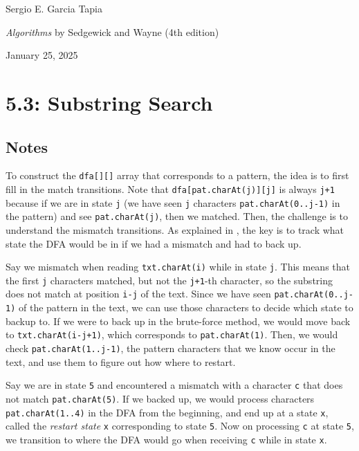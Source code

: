 \documentclass[12pt, a4paper]{article}
\begin{document}
	\noindent Sergio E. Garcia Tapia \hfill
	
	\noindent \emph{Algorithms} by Sedgewick and Wayne (4th edition) \cite{sedgewick_wayne}\hfill
	
	\noindent January 25, 2025\hfill 
	\section*{5.3: Substring Search}
	\subsection*{Notes}
	To construct the \texttt{dfa[][]} array that corresponds to a pattern, the idea is to first
	fill in the match transitions. Note that \texttt{dfa[pat.charAt(j)][j]} is always \texttt{j+1}
	because if we are in state \texttt{j} (we have seen \texttt{j} characters \texttt{pat.charAt(0..j-1)}
	in the pattern) and see \texttt{pat.charAt(j)}, then we matched. Then, the challenge is
	to understand the mismatch transitions. As explained in \cite{sedgewick_wayne}, the key is
	to track what state the DFA would be in if we had a mismatch and had to back up.
	
	Say we mismatch when reading \texttt{txt.charAt(i)} while in state \texttt{j}. This
	means that the first \texttt{j} characters matched, but not the \texttt{j+1}-th character,
	so the substring does not match at position \texttt{i-j} of the text. Since we have
	seen \texttt{pat.charAt(0..j-1)} of the pattern in the text, we can use those characters
	to decide which state to backup to. If we were to back up in the brute-force method, we
	would move back to \texttt{txt.charAt(i-j+1)}, which corresponds to \texttt{pat.charAt(1)}.
	Then, we would check \texttt{pat.charAt(1..j-1)}, the pattern characters that we know occur
	in the text, and use them to figure out how where to restart.
	
	Say we are in state \texttt{5} and encountered a mismatch with a character \texttt{c}
	that does not match \texttt{pat.charAt(5)}. If we backed up, we would process characters
	\texttt{pat.charAt(1..4)} in the DFA from the beginning, and end up at a state
	\texttt{x}, called the \emph{restart state} \texttt{x} corresponding to state \texttt{5}.
	Now on processing \texttt{c} at state \texttt{5}, we transition to where the DFA
	would go when receiving \texttt{c} while in state \texttt{x}.
\end{document}
